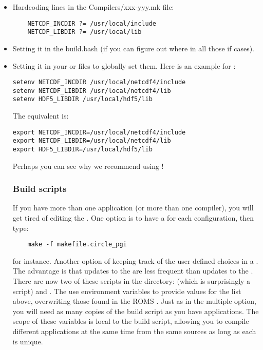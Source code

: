 \begin{itemize}
  \item Hardcoding lines in the Compilers/xxx-yyy.mk file:
\begin{verbatim}
    NETCDF_INCDIR ?= /usr/local/include
    NETCDF_LIBDIR ?= /usr/local/lib
\end{verbatim}
  \item Setting it in the build.bash (if you can figure out where in
  all those if cases).
  \item Setting it in your 
or  files to globally set them. Here is an example for
:
\begin{verbatim}
setenv NETCDF_INCDIR /usr/local/netcdf4/include
setenv NETCDF_LIBDIR /usr/local/netcdf4/lib
setenv HDF5_LIBDIR /usr/local/hdf5/lib
\end{verbatim}
The  equivalent is:
\begin{verbatim}
export NETCDF_INCDIR=/usr/local/netcdf4/include
export NETCDF_LIBDIR=/usr/local/netcdf4/lib
export HDF5_LIBDIR=/usr/local/hdf5/lib
\end{verbatim}
Perhaps you can see why we recommend using !

\subsubsection{Build scripts}

If you have more than one application (or more than one compiler),
you will get tired of editing the .
One option is to have a  for each configuration, then
type:
\begin{verbatim}
    make -f makefile.circle_pgi
\end{verbatim}
for instance. Another option of keeping track of the user-defined
choices in a . The advantage is that updates
to the  are less frequent than updates to the
. There are now two of these scripts in the 
directory:  (which is surprisingly a  script)
and .  The  use environment variables
to provide values for the list above, overwriting those found in the ROMS
. Just as in the multiple  option, you will
need as many copies of the build script as you have applications. The
scope of these variables is local to the build script, allowing you to
compile different applications at the same time from the same sources
as long as each  is unique.


\end{itemize}
